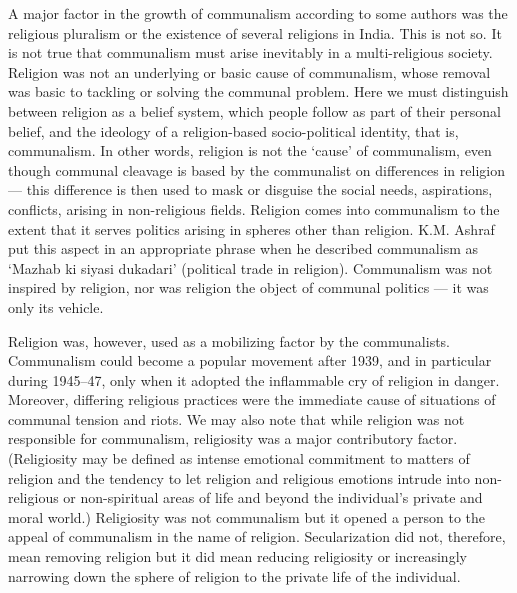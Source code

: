 A major factor in the growth of communalism according to some authors was the religious pluralism or the existence of several religions in India. This is not so. It is not true that communalism must arise inevitably in a multi-religious society. Religion was not an underlying or basic cause of communalism, whose removal was basic to tackling or solving the communal problem. Here we must distinguish between religion as a belief system, which people follow as part of their personal belief, and the ideology of a religion-based socio-political identity, that is, communalism. In other words, religion is not the `cause' of communalism, even though communal cleavage is based by the communalist on differences in religion --- this difference is then used to mask or disguise the social needs, aspirations, conflicts, arising in non-religious fields. Religion comes into communalism to the extent that it serves politics arising in spheres other than religion. K.M. Ashraf put this aspect in an appropriate phrase when he described communalism as `Mazhab ki siyasi dukadari' (political trade in religion). Communalism was not inspired by religion, nor was religion the object of communal politics --- it was only its vehicle. 

Religion was, however, used as a mobilizing factor by the communalists. Communalism could become a popular movement after 1939, and in particular during 1945--47, only when it adopted the inflammable cry of religion in danger. Moreover, differing religious practices were the immediate cause of situations of communal tension and riots. We may also note that while religion was not responsible for communalism, religiosity was a major contributory factor. (Religiosity may be defined as intense emotional commitment to matters of religion and the tendency to let religion and religious emotions intrude into non-religious or non-spiritual areas of life and beyond the individual's private and moral world.) Religiosity was not communalism but it opened a person to the appeal of communalism in the name of religion. Secularization did not, therefore, mean removing religion but it did mean reducing religiosity or increasingly narrowing down the sphere of religion to the private life of the individual.
